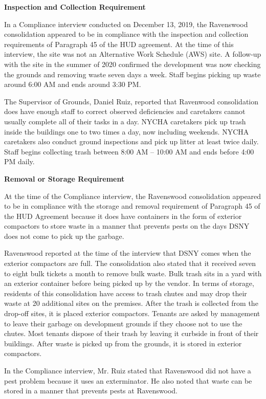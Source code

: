 
\textbf{Inspection and Collection Requirement}

In a Compliance interview conducted on December 13, 2019, the Ravenswood consolidation appeared to be in compliance with the inspection and collection requirements of Paragraph 45 of the HUD agreement. At the time of this interview, the site was not an Alternative Work Schedule (AWS) site. A follow-up with the site in the summer of 2020 confirmed the development was now checking the grounds and removing waste seven days a week. Staff begins picking up waste around 6:00 AM and ends around 3:30 PM.

The Supervisor of Grounds, Daniel Ruiz, reported that Ravenwood consolidation does have enough staff to correct observed deficiencies and caretakers cannot usually complete all of their tasks in a day. NYCHA caretakers pick up trash inside the buildings one to two times a day, now including weekends. NYCHA caretakers also conduct ground inspections and pick up litter at least twice daily. Staff begins collecting trash between 8:00 AM -- 10:00 AM and ends before 4:00 PM daily.

\textbf{Removal or Storage Requirement}

At the time of the Compliance interview, the Ravenswood consolidation appeared to be in compliance with the storage and removal requirement of Paragraph 45 of the HUD Agreement because it does have containers in the form of exterior compactors to store waste in a manner that prevents pests on the days DSNY does not come to pick up the garbage. 

Ravenswood reported at the time of the interview that DSNY comes when the exterior compactors are full. The consolidation also stated that it received seven to eight bulk tickets a month to remove bulk waste. Bulk trash sits in a yard with an exterior container before being picked up by the vendor. In terms of storage, residents of this consolidation have access to trash chutes and may drop their waste at 20 additional sites on the premises. After the trash is collected from the drop-off sites, it is placed exterior compactors. Tenants are asked by management to leave their garbage on development grounds if they choose not to use the chutes. Most tenants dispose of their trash by leaving it curbside in front of their buildings. After waste is picked up from the grounds, it is stored in exterior compactors. 

In the Compliance interview, Mr. Ruiz stated that Ravenswood did not have a pest problem because it uses an exterminator. He also noted that waste can be stored in a manner that prevents pests at Ravenswood.


